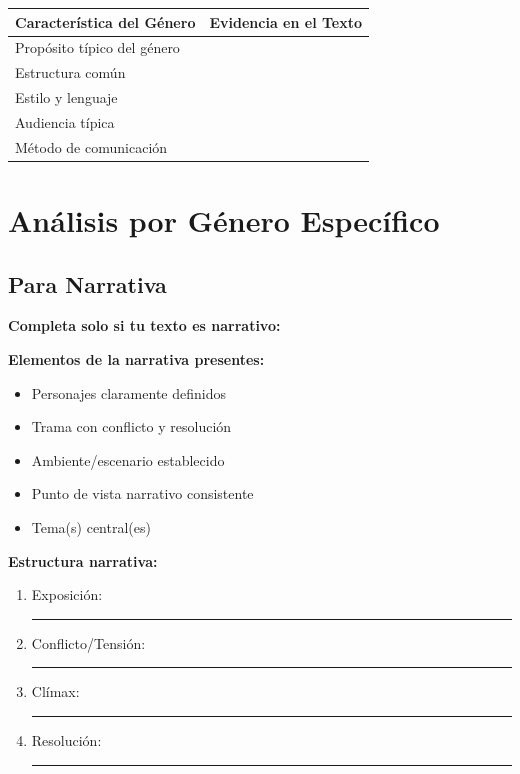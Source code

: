 \documentclass[11pt,a4paper]{article}
\begin{document}
\begin{tabularx}{\textwidth}{|X|X|}
\hline
\textbf{Característica del Género} & \textbf{Evidencia en el Texto} \\
\hline
Propósito típico del género & \\[1.5cm]
\hline
Estructura común & \\[1.5cm]
\hline
Estilo y lenguaje & \\[1.5cm]
\hline
Audiencia típica & \\[1.5cm]
\hline
Método de comunicación & \\[1.5cm]
\hline
\end{tabularx}

\newpage

\section{Análisis por Género Específico}

\subsection{Para Narrativa}

\begin{literarybox}
\textbf{Completa solo si tu texto es narrativo:}
\end{literarybox}

\textbf{Elementos de la narrativa presentes:}
\begin{itemize}[leftmargin=1cm]
    \item[$\square$] Personajes claramente definidos
    \item[$\square$] Trama con conflicto y resolución
    \item[$\square$] Ambiente/escenario establecido
    \item[$\square$] Punto de vista narrativo consistente
    \item[$\square$] Tema(s) central(es)
\end{itemize}

\textbf{Estructura narrativa:}
\begin{enumerate}[leftmargin=1cm]
    \item Exposición: \rule{10cm}{0.4pt}
    \item Conflicto/Tensión: \rule{10cm}{0.4pt}
    \item Clímax: \rule{10cm}{0.4pt}
    \item Resolución: \rule{10cm}{0.4pt}
\end{enumerate}
\end{document}
